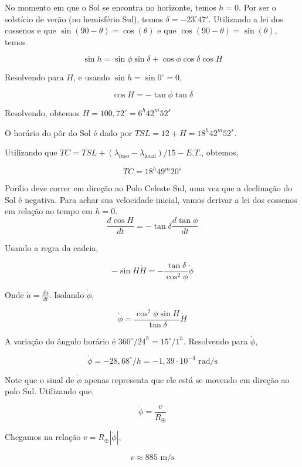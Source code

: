 \documentclass[11pt]{article}
\begin{document}
\begin{pproblem}
\begin{pssolution*}{}{ }
\begin{alternativas}
        No momento em que o Sol se encontra no horizonte, temos \(h = 0\). Por ser o solstício de verão (no hemisfério Sul), temos \(\delta = -23^\circ 47'\). Utilizando a lei dos cossenos e que \(\sin(90 - \theta) = \cos(\theta)\) e que \(\cos(90 - \theta) = \sin(\theta)\), temos 

        \[\sin h = \sin\phi\sin\delta + \cos\phi\cos\delta\cos H\]

        Resolvendo para \(H\), e usando \(\sin h = \sin 0^\circ = 0\), 

        \[\cos H = -\tan\phi\tan\delta\]

        Resolvendo, obtemos \(H = 100,72^\circ = 6^h 42^m 52^s\)

        O horário do pôr do Sol é dado por \(TSL = 12 + H = 18^h 42^m 52^s\).

        Utilizando que \(TC = TSL + (\lambda_{\text{fuso}} - \lambda_{\text{local}})/15 - E.T.\), obtemos, 

        \[\boxed{TC = 18^h 49^m 20^s}\]

        \item Porílio deve correr em direção ao Polo Celeste Sul, uma vez que a declinação do Sol é negativa. Para achar sua velocidade inicial, vamos derivar a lei dos cossenos em relação ao tempo em \(h = 0\).
        \[\frac{d\cos H}{dt} = -\tan\delta \frac{d\tan\phi}{dt}\]

        Usando a regra da cadeia, 

        \[-\sin H \dot{H} = -\frac{\tan\delta}{\cos^2\phi}\dot{\phi}\]

        Onde \(\dot{a} = \frac{da}{dt}\). Isolando \(\dot{\phi}\), 

        \[\dot{\phi} = \frac{\cos^2\phi\sin H}{\tan\delta}\dot{H}\]

        A variação do ângulo horário é \(360^\circ / 24^h = 15^\circ / 1^h\). Resolvendo para \(\dot{\phi}\), 

        \[\dot{\phi} = -28,68^\circ/h = -1,39 \cdot 10^{-4} \text{ rad/s}\]

        Note que o sinal de \(\dot{\phi}\) apenas representa que ele está se movendo em direção ao polo Sul. Utilizando que, 

        \[\dot{\phi} = \frac{v}{R_\oplus}\]

        Chegamos na relação \(v = R_\oplus|\dot{\phi}|\),
        
        \[\boxed{v \approx 885 \text{ m/s}}\]


\end{alternativas}
\end{pssolution*}
\end{pproblem}
\end{document}
